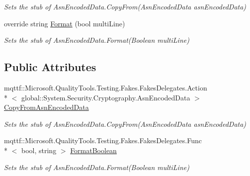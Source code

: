 \begin{DoxyCompactItemize}
\begin{DoxyCompactList}\small\item\em Sets the stub of Asn\-Encoded\-Data.\-Copy\-From(\-Asn\-Encoded\-Data asn\-Encoded\-Data)\end{DoxyCompactList}\item 
override string \hyperlink{class_system_1_1_security_1_1_cryptography_1_1_fakes_1_1_stub_asn_encoded_data_a8a5d3a61ea0530e2b39491cab0d694a3}{Format} (bool multi\-Line)
\begin{DoxyCompactList}\small\item\em Sets the stub of Asn\-Encoded\-Data.\-Format(\-Boolean multi\-Line)\end{DoxyCompactList}\end{DoxyCompactItemize}
\subsection*{Public Attributes}
\begin{DoxyCompactItemize}
\item 
mqttf\-::\-Microsoft.\-Quality\-Tools.\-Testing.\-Fakes.\-Fakes\-Delegates.\-Action\\*
$<$ global\-::\-System.\-Security.\-Cryptography.\-Asn\-Encoded\-Data $>$ \hyperlink{class_system_1_1_security_1_1_cryptography_1_1_fakes_1_1_stub_asn_encoded_data_af244699329090369419491e63d81c946}{Copy\-From\-Asn\-Encoded\-Data}
\begin{DoxyCompactList}\small\item\em Sets the stub of Asn\-Encoded\-Data.\-Copy\-From(\-Asn\-Encoded\-Data asn\-Encoded\-Data)\end{DoxyCompactList}\item 
mqttf\-::\-Microsoft.\-Quality\-Tools.\-Testing.\-Fakes.\-Fakes\-Delegates.\-Func\\*
$<$ bool, string $>$ \hyperlink{class_system_1_1_security_1_1_cryptography_1_1_fakes_1_1_stub_asn_encoded_data_ac2346d021a64d16b12726b93beff42ea}{Format\-Boolean}
\begin{DoxyCompactList}\small\item\em Sets the stub of Asn\-Encoded\-Data.\-Format(\-Boolean multi\-Line)\end{DoxyCompactList}\end{DoxyCompactItemize}
